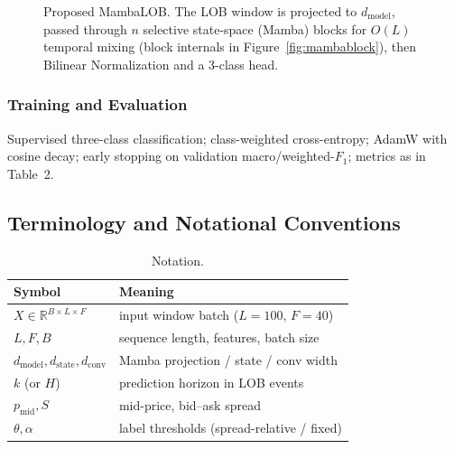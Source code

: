 \documentclass[11pt]{article}
\begin{document}
\begin{figure}[h]
\centering
{}
\caption{Proposed MambaLOB. The LOB window is projected to $d_{\mathrm{model}}$, passed through $n$ selective
state-space (Mamba) blocks for $O(L)$ temporal mixing (block internals in Figure~\ref{fig:mambablock}), then
Bilinear Normalization and a 3-class head.}
\label{fig:arch}
\end{figure}

\subsubsection{Training and Evaluation}
Supervised three-class classification; class-weighted cross-entropy; AdamW with cosine decay; early
stopping on validation macro/weighted-$F_1$; metrics as in Table~2.

\subsection{Terminology and Notational Conventions}
\begin{table}[h]
\centering
\caption{Notation.}
\begin{tabular}{@{}ll@{}}
\toprule
Symbol & Meaning \\
\midrule
$X \in \mathbb{R}^{B\times L\times F}$ & input window batch ($L=100$, $F=40$) \\
$L, F, B$ & sequence length, features, batch size \\
$d_{\mathrm{model}}, d_{\mathrm{state}}, d_{\mathrm{conv}}$ & Mamba projection / state / conv width \\
$k$ (or $H$) & prediction horizon in LOB events \\
$p_{\mathrm{mid}}, S$ & mid-price, bid--ask spread \\
$\theta, \alpha$ & label thresholds (spread-relative / fixed) \\
\bottomrule
\end{tabular}
\end{table}
\end{document}
